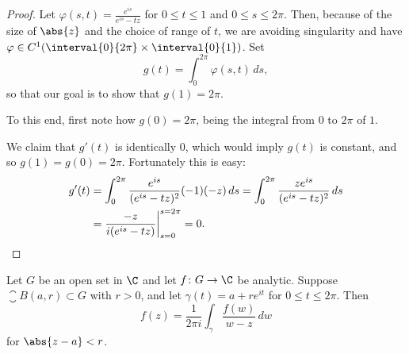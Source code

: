 \begin{proof}
	Let $\varphi(s, t) = \frac{e^{i s}}{e^{i s} - t z}$ for $0 \leq t \leq 1$ and $0 \leq s \leq 2 \pi$.
	Then, because of the size of $\abs{z}$ and the choice of range of $t$, we are avoiding singularity and have $\varphi \in C^1(\interval{0}{2 \pi} \times \interval{0}{1})$.
	Set
	\[
		g(t) = \int_0^{2 \pi} \varphi(s, t) \, d s,
	\]
	so that our goal is to show that $g(1) = 2 \pi$.

	To this end, first note how $g(0) = 2 \pi$, being the integral from $0$ to $2 \pi$ of $1$.

	We claim that $g'(t)$ is identically $0$, which would imply $g(t)$ is constant, and so $g(1) = g(0) = 2 \pi$.
	Fortunately this is easy:
	\begin{align*}
		g'(t) &= \int_0^{2 \pi} \frac{e^{i s}}{(e^{i s} - t z)^2} (-1) (-z) \, d s = \int_0^{2 \pi} \frac{z e^{i s}}{(e^{i s} - t z)^2} \, d s \\
		&= \frac{- z}{i(e^{i s} - t z)} \biggr\rvert_{s = 0}^{s = 2 \pi} = 0. \qedhere
	\end{align*}
\end{proof}

\begin{proposition}\label{prop3.3}
	Let $G$ be an open set in $\C$ and let $f \colon G \to \C$ be analytic.
	Suppose $\closure{B(a, r)} \subset G$ with $r > 0$, and let $\gamma(t) = a + r e^{i t}$ for $0 \leq t \leq 2 \pi$.
	Then
	\[
		f(z) = \frac{1}{2 \pi i} \int_\gamma \frac{f(w)}{w - z} \, d w
	\]
	for $\abs{z - a} < r$.
\end{proposition}

